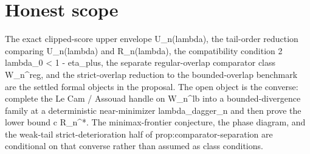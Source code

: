 \documentclass{article}
\begin{document}
\section{Honest scope}

The exact clipped-score upper envelope U_n(lambda), the tail-order reduction comparing U_n(lambda) and R_n(lambda), the compatibility condition 2 lambda_0 < 1 - eta_plus, the separate regular-overlap comparator class W_n^reg, and the strict-overlap reduction to the bounded-overlap benchmark are the settled formal objects in the proposal. The open object is the converse: complete the Le Cam / Assouad handle on W_n^lb into a bounded-divergence family at a deterministic near-minimizer lambda_dagger_n and then prove the lower bound c R_n^*. The minimax-frontier conjecture, the phase diagram, and the weak-tail strict-deterioration half of prop:comparator-separation are conditional on that converse rather than assumed as class conditions.
\end{document}
